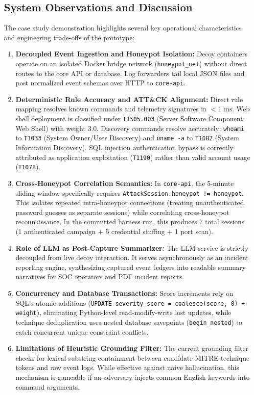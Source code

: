 \documentclass[12pt,a4paper]{report}
\begin{document}
\subsection{System Observations and Discussion}

The case study demonstration highlights several key operational characteristics and engineering trade-offs of the prototype:

\begin{enumerate}
\item \textbf{Decoupled Event Ingestion and Honeypot Isolation:} Decoy containers operate on an isolated Docker bridge network (\texttt{honeypot\_net}) without direct routes to the core API or database. Log forwarders tail local JSON files and post normalized event schemas over HTTP to \texttt{core-api}.
\item \textbf{Deterministic Rule Accuracy and ATT\&CK Alignment:} Direct rule mapping resolves known commands and telemetry signatures in $< 1\text{ ms}$. Web shell deployment is classified under \texttt{T1505.003} (Server Software Component: Web Shell) with weight 3.0. Discovery commands resolve accurately: \texttt{whoami} to \texttt{T1033} (System Owner/User Discovery) and \texttt{uname -a} to \texttt{T1082} (System Information Discovery). SQL injection authentication bypass is correctly attributed as application exploitation (\texttt{T1190}) rather than valid account usage (\texttt{T1078}).
\item \textbf{Cross-Honeypot Correlation Semantics:} In \texttt{core-api}, the 5-minute sliding window specifically requires \texttt{AttackSession.honeypot != honeypot}. This isolates repeated intra-honeypot connections (treating unauthenticated password guesses as separate sessions) while correlating cross-honeypot reconnaissance. In the committed harness run, this produces 7 total sessions (1 authenticated campaign + 5 credential stuffing + 1 port scan).
\item \textbf{Role of LLM as Post-Capture Summarizer:} The LLM service is strictly decoupled from live decoy interaction. It serves asynchronously as an incident reporting engine, synthesizing captured event ledgers into readable summary narratives for SOC operators and PDF incident reports.
\item \textbf{Concurrency and Database Transactions:} Score increments rely on SQL's atomic additions (\texttt{UPDATE severity\_score = coalesce(score, 0) + weight}), eliminating Python-level read-modify-write lost updates, while technique deduplication uses nested database savepoints (\texttt{begin\_nested}) to catch concurrent unique constraint conflicts.
\item \textbf{Limitations of Heuristic Grounding Filter:} The current grounding filter checks for lexical substring containment between candidate MITRE technique tokens and raw event logs. While effective against naive hallucination, this mechanism is gameable if an adversary injects common English keywords into command arguments.
\end{enumerate}
\end{document}
